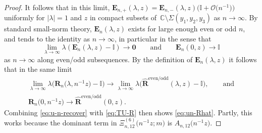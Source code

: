 \documentclass[11pt]{article}
\numberwithin{equation}{section}
\numberwithin{equation}{section}
\newcommand{\C}{{\mathbb{C}}}
\begin{document}
\begin{proof}
It follows that in this limit, $\mathbf{E}_{n,+}(\lambda,z)=\mathbf{E}_{n,-}(\lambda,z)\big(\mathbb{I}+\mathcal{O}\big(n^{-1}\big)\big)$ uniformly for $|\lambda|=1$ and $z$ in compact subsets of~$\C\setminus \Sigma(y_1, y_2, y_3)$ as $n\to\infty$. By standard small-norm theory, $\mathbf{E}_n(\lambda,z)$ exists for large enough even or odd $n$, and tends to the identity as $n\to\infty$, in particular in the sense that
\begin{equation*}
 \lim_{\lambda\to\infty}\lambda(\mathbf{E}_n(\lambda,z)-\mathbb{I})\to\mathbf{0}\qquad\text{and}\qquad\mathbf{E}_n(0,z)\to\mathbb{I}
\end{equation*}
as $n\to\infty$ along even/odd subsequences. By the definition of $\mathbf{E}_n(\lambda,z)$ it follows that in the same limit
\begin{gather*}
 \lim_{\lambda\to\infty}\lambda\big(\mathbf{R}_n\big(\lambda,n^{-1}z\big)-\mathbb{I}\big)\to\lim_{\lambda\to\infty}\lambda\big(\hat{\mathbf{R}}^\mathrm{even/odd}(\lambda,z)-\mathbb{I}\big), \qquad \text{and}\\
 \mathbf{R}_n\big(0,n^{-1}z\big)\to\hat{\mathbf{R}}^\mathrm{even/odd}(0,z).
\end{gather*}
Combining \eqref{eq:u-n-recover} with \eqref{eq:TU-R} then shows \eqref{eq:un-Rhat}.
Partly, this works because the dominant term in $\Xi_{n,12}^{(6)}\big(n^{-1}z;m\big)$ is $A_{n,12}\big(n^{-1}z\big)$.
\end{proof}
\end{document}
